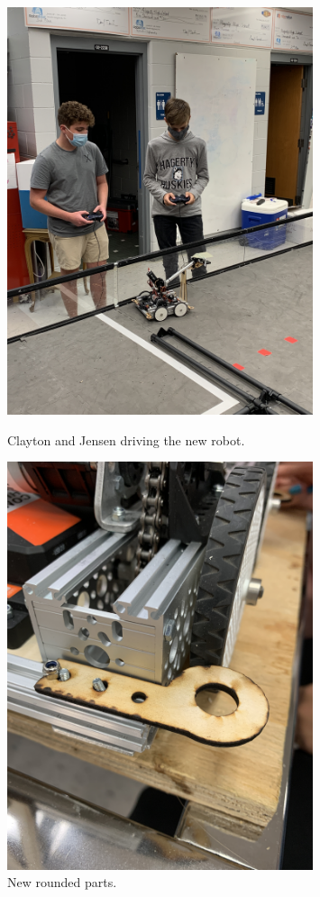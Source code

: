 \begin{figure}[ht]
\centering
\begin{minipage}[b]{.50\textwidth}
  \centering
  \includegraphics[width=0.8\textwidth]{Meetings/October/10-12-21/10-12-21_Team_Figure1 - Nathan Forrer.JPG}
  \caption{Clayton and Jensen driving the new robot.}
  \label{fig:pic1}
\end{minipage}%
\hfill%
\begin{minipage}[b]{.50\textwidth}
  \centering
  \includegraphics[width=0.8\textwidth]{Meetings/October/10-12-21/10-12-21_Team_Figure2 - Nathan Forrer.JPG}
  \caption{New rounded parts.}
  \label{fig:pic2}
\end{minipage}
\end{figure}

